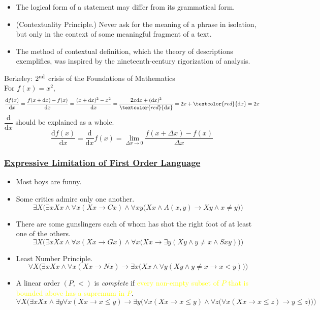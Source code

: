 \documentclass[UTF8,11pt,colorlinks,compress,openany]{beamer}%
\begin{document}
\begin{frame}\frametitle{}
\begin{itemize}
	\item The logical form of a statement may differ from its grammatical form.
	\item (Contextuality Principle.) Never ask for the meaning of a phrase in isolation, but only in the context of some meaningful fragment of a text.
	\item The method of contextual definition, which the theory of descriptions exemplifies, was inspired by the nineteenth-century rigorization of analysis.
\end{itemize}
Berkeley: $2\textsuperscript{nd}$ crisis of the Foundations of Mathematics\\
For $f(x)=x^2$,
\[\dfrac{\mathrm{d} f(x)}{\mathrm{d}x}=\dfrac{f(x+\mathrm{d}x)-f(x)}{\mathrm{d}x}=\dfrac{(x+\mathrm{d}x)^2-x^2}{\mathrm{d}x}=\dfrac{2x\mathrm{d}x+(\mathrm{d}x)^2}{\textcolor{red}{\mathrm{d}x}}=2x+\textcolor{red}{\mathrm{d}x}=2x\]
$\dfrac{\mathrm{d}}{\mathrm{d}x}$ should be explained as a whole.
\[\dfrac{\mathrm{d} f(x)}{\mathrm{d}x}=\dfrac{\mathrm{d}}{\mathrm{d}x}f(x)=\lim\limits_{\Delta x\to 0}\dfrac{f(x+\Delta x)-f(x)}{\Delta x}\]
\end{frame}

\begin{frame}\frametitle{\href{https://www.pdcnet.org/jphil/content/jphil_1984_0081_0008_0430_0449}{Expressive Limitation of First Order Language}}
\begin{itemize}
	\item Most boys are funny.
	\item Some critics admire only one another.
\[\exists X\Big(\exists x Xx\wedge \forall x(Xx\to Cx)\wedge \forall xy\big(Xx\wedge A(x,y)\to Xy\wedge x\ne y\big)\Big)\]
	\item There are some gunslingers each of whom has shot the right foot of at least one of the others.
\[\exists X\Big(\exists xXx\wedge \forall x(Xx\to Gx)\wedge\forall x\big(Xx\to\exists y(Xy\wedge y\ne x\wedge Sxy)\big)\Big)\]
	\item Least Number Principle.
\[\forall X\Big(\exists xXx\wedge \forall x(Xx\to Nx)\to\exists x\big(Xx\wedge\forall y(Xy\wedge y\ne x\to x<y)\big)\Big)\]
	\item A linear order $(P,<)$ is \emph{complete} if \textcolor{yellow}{every non-empty subset of $P$ that is bounded above has a supremum in $P$}.\\
$\forall X\bigg(\exists x Xx\wedge\exists y\forall x(Xx\to x\leq y)\to\exists y\Big(\forall x(Xx\to x\leq y)\wedge\forall z\big(\forall x(Xx\to x\leq z)\to y\leq z\big)\Big)\bigg)$
\end{itemize}
\end{frame}
\end{document}
